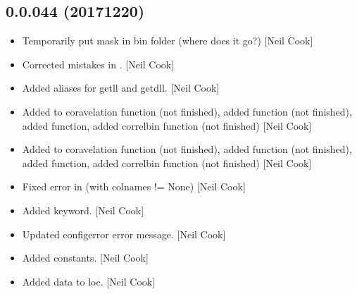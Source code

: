 \documentclass[a4paper,10pt,english]{report}
\begin{document}
\subsection{0.0.044 (2017\sphinxhyphen{}12\sphinxhyphen{}20)}
\label{\detokenize{misc/changelog:id527}}\begin{itemize}
\item {} 
Temporarily put mask in bin folder (where does it go?) {[}Neil Cook{]}

\item {} 
Corrected mistakes in . {[}Neil Cook{]}

\item {} 
Added aliases for getll and getdll. {[}Neil Cook{]}

\item {} 
Added to coravelation function (not finished), added 
function (not finished), added  function, added correlbin
function (not finished) {[}Neil Cook{]}

\item {} 
Added to coravelation function (not finished), added 
function (not finished), added  function, added correlbin
function (not finished) {[}Neil Cook{]}

\item {} 
Fixed error in  (with colnames != None) {[}Neil Cook{]}

\item {} 
Added keyword. {[}Neil Cook{]}

\item {} 
Updated configerror error message. {[}Neil Cook{]}

\item {} 
Added constants. {[}Neil Cook{]}

\item {} 
Added data to loc. {[}Neil Cook{]}

\end{itemize}
\end{document}

